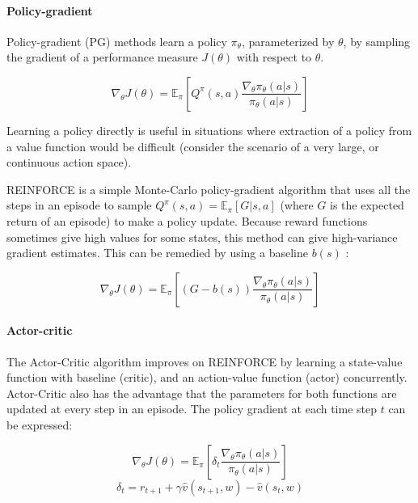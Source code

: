 \documentclass[11pt,a4paper]{article}
\begin{document}
\paragraph{Policy-gradient} Policy-gradient (PG) methods learn a policy $\pi_\theta$, parameterized by $\theta$,
by sampling the gradient of a performance measure $J(\theta)$ with respect to $\theta$.

\begin{equation}
  \nabla_\theta J(\theta)=\mathbb{E}_\pi\left[Q^\pi(s, a) \frac{\nabla_\theta\pi_\theta(a|s)}{\pi_\theta(a|s)}\right]
\end{equation}

Learning a policy directly is useful in situations where extraction of a policy from a value function would be difficult (consider the scenario of a very large, or continuous action space).

REINFORCE \citep{Williams92simplestatistical} is a simple Monte-Carlo policy-gradient algorithm that uses all the steps in an episode to sample $Q^\pi(s,a)=\mathbb{E}_\pi[G|s,a]$ (where $G$ is the expected return of an episode) to make a policy update.
Because reward functions sometimes give high values for some states, this method can give high-variance gradient estimates.
This can be remedied by using a baseline $b(s)$ \citep{SuttonBarto}:

\begin{equation}
  \nabla_\theta J(\theta)=\mathbb{E}_\pi\left[(G-b(s)) \frac{\nabla_\theta\pi_\theta(a|s)}{\pi_\theta(a|s)}\right]
\end{equation}

\paragraph{Actor-critic} The Actor-Critic algorithm \citep{bhatnagar2009natural} improves on REINFORCE by learning a state-value function with baseline (critic), and an action-value function (actor) concurrently.
Actor-Critic also has the advantage that the parameters for both functions are updated at every step in an episode.
The policy gradient at each time step $t$ can be expressed:

\begin{equation}
  \nabla_\theta J(\theta)=\mathbb{E}_\pi\left[\delta_t \frac{\nabla_\theta\pi_\theta(a|s)}{\pi_\theta(a|s)}\right]
\end{equation}
\begin{equation}
  \delta_t = r_{t+1}+\gamma \hat{v}(s_{t+1}, w)-\hat{v}(s_t,w)
\end{equation}
\end{document}
